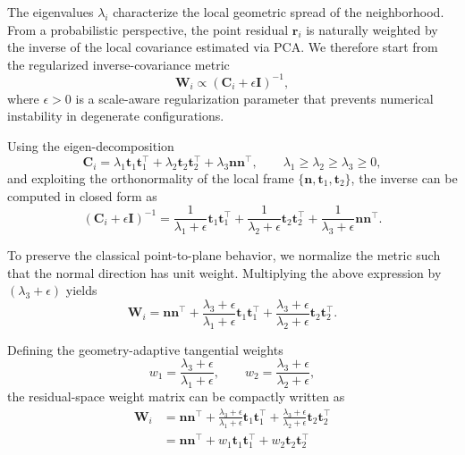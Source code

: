 The eigenvalues \(\lambda_i\) characterize the local geometric spread of the neighborhood.
From a probabilistic perspective, the point residual \(\mathbf{r}_i\) is naturally weighted
by the inverse of the local covariance estimated via PCA. We therefore start from the
regularized inverse-covariance metric
\begin{equation}
\mathbf{W}_i \propto (\mathbf{C}_i + \epsilon \mathbf{I})^{-1},
\end{equation}
where \(\epsilon > 0\) is a scale-aware regularization parameter that prevents numerical
instability in degenerate configurations.

Using the eigen-decomposition
\begin{equation}
\mathbf{C}_i
=
\lambda_1 \mathbf{t}_1 \mathbf{t}_1^\top
+
\lambda_2 \mathbf{t}_2 \mathbf{t}_2^\top
+
\lambda_3 \mathbf{n}\mathbf{n}^\top,
\qquad
\lambda_1 \ge \lambda_2 \ge \lambda_3 \ge 0,
\end{equation}
and exploiting the orthonormality of the local frame
\(\{\mathbf{n}, \mathbf{t}_1, \mathbf{t}_2\}\),
the inverse can be computed in closed form as
\begin{equation}
(\mathbf{C}_i + \epsilon \mathbf{I})^{-1}
=
\frac{1}{\lambda_1 + \epsilon}\mathbf{t}_1\mathbf{t}_1^\top
+
\frac{1}{\lambda_2 + \epsilon}\mathbf{t}_2\mathbf{t}_2^\top
+
\frac{1}{\lambda_3 + \epsilon}\mathbf{n}\mathbf{n}^\top .
\end{equation}

To preserve the classical point-to-plane behavior, we normalize the metric such that the
normal direction has unit weight. Multiplying the above expression by
\((\lambda_3 + \epsilon)\) yields
\begin{equation}
\mathbf{W}_i
=
\mathbf{n}\mathbf{n}^\top
+
\frac{\lambda_3 + \epsilon}{\lambda_1 + \epsilon}\mathbf{t}_1\mathbf{t}_1^\top
+
\frac{\lambda_3 + \epsilon}{\lambda_2 + \epsilon}\mathbf{t}_2\mathbf{t}_2^\top .
\end{equation}

Defining the geometry-adaptive tangential weights
\begin{equation}
w_1 = \frac{\lambda_3 + \epsilon}{\lambda_1 + \epsilon},
\qquad
w_2 = \frac{\lambda_3 + \epsilon}{\lambda_2 + \epsilon},
\end{equation}
the residual-space weight matrix can be compactly written as
\begin{equation}
\begin{split}
    \mathbf{W}_i &= \mathbf{n}\mathbf{n}^\top + \frac{\lambda_3 + \epsilon}{\lambda_1 + \epsilon}\mathbf{t}_1\mathbf{t}_1^\top + \frac{\lambda_3 + \epsilon}{\lambda_2 + \epsilon}\mathbf{t}_2\mathbf{t}_2^\top \\
     &= \mathbf{n}\mathbf{n}^\top + w_1\mathbf{t}_1\mathbf{t}_1^\top + w_2\mathbf{t}_2\mathbf{t}_2^\top
\end{split}
\end{equation}


